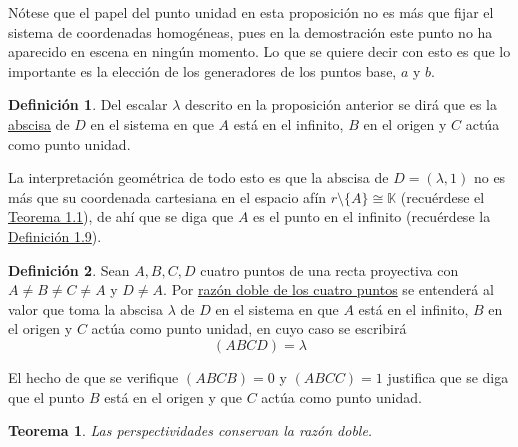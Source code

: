 \documentclass[12pt]{report}
\newtheorem{theorem}{Teorema}[chapter]
\theoremstyle{definition}
\newtheorem{definition}{Definición}[chapter]
\theoremstyle{definition}
\theoremstyle{remark}
\begin{document}
Nótese que el papel del punto unidad en esta proposición no es más que fijar el sistema de coordenadas homogéneas, pues en la demostración este punto no ha aparecido en escena en ningún momento. Lo que se quiere decir con esto es que lo importante es la elección de los generadores de los puntos base, $a$ y $b$.

\begin{definition}
Del escalar $\lambda$ descrito en la proposición anterior se dirá que es la \ul{abscisa} de $D$ en el sistema en que $A$ está en el infinito, $B$ en el origen y $C$ actúa como punto unidad.
\end{definition}

La interpretación geométrica de todo esto es que la abscisa de $D = (\lambda,1)$ no es más que su coordenada cartesiana en el espacio afín $r \setminus \{A\} \cong \mathbb{K}$ (recuérdese el \hyperref[teo1.1.]{\color{blue}Teorema 1.1}), de ahí que se diga que $A$ es el punto en el infinito (recuérdese la \hyperref[def1.9.]{\color{blue}Definición 1.9}).

\begin{definition}
Sean $A,B,C,D$ cuatro puntos de una recta proyectiva con $A \neq B \neq C \neq A$ y $D \neq A$. Por \ul{razón doble de los cuatro puntos} se entenderá al valor que toma la abscisa $\lambda$ de $D$ en el sistema en que $A$ está en el infinito, $B$ en el origen y $C$ actúa como punto unidad, en cuyo caso se escribirá
\[(ABCD) = \lambda\]
\end{definition}

El hecho de que se verifique $(ABCB) = 0$ y $(ABCC) = 1$ justifica que se diga que el punto $B$ está en el origen y que $C$ actúa como punto unidad.

\begin{theorem}
\label{teo2.2.}
Las perspectividades conservan la razón doble.
\end{theorem}
\end{document}
